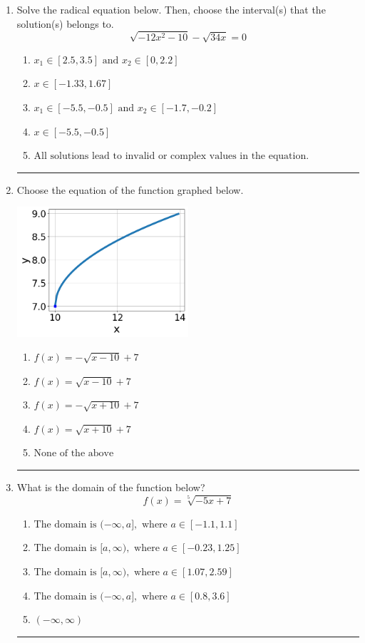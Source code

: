 \documentclass[14pt]{extbook}
\newcommand{\litem}[1]{\item#1\hspace*{-1cm}\rule{\textwidth}{0.4pt}}
\begin{document}
\begin{enumerate}
{\begin{enumerate}[label=\Alph*.]
\end{enumerate} }
\litem{
Solve the radical equation below. Then, choose the interval(s) that the solution(s) belongs to.\[ \sqrt{-12 x^2 - 10} - \sqrt{34 x} = 0 \]\begin{enumerate}[label=\Alph*.]
\item \( x_1 \in [2.5, 3.5] \text{ and } x_2 \in [0,2.2] \)
\item \( x \in [-1.33,1.67] \)
\item \( x_1 \in [-5.5, -0.5] \text{ and } x_2 \in [-1.7,-0.2] \)
\item \( x \in [-5.5,-0.5] \)
\item \( \text{All solutions lead to invalid or complex values in the equation.} \)

\end{enumerate} }
\litem{
Choose the equation of the function graphed below.
\begin{center}
    \includegraphics[width=0.5\textwidth]{../Figures/radicalGraphToEquationCopyA.png}
\end{center}
\begin{enumerate}[label=\Alph*.]
\item \( f(x) = - \sqrt{x - 10} + 7 \)
\item \( f(x) = \sqrt{x - 10} + 7 \)
\item \( f(x) = - \sqrt{x + 10} + 7 \)
\item \( f(x) = \sqrt{x + 10} + 7 \)
\item \( \text{None of the above} \)

\end{enumerate} }
\litem{
What is the domain of the function below?\[ f(x) = \sqrt[5]{-5 x + 7} \]\begin{enumerate}[label=\Alph*.]
\item \( \text{The domain is } (-\infty, a], \text{   where } a \in [-1.1, 1.1] \)
\item \( \text{The domain is } [a, \infty), \text{   where } a \in [-0.23, 1.25] \)
\item \( \text{The domain is } [a, \infty), \text{   where } a \in [1.07, 2.59] \)
\item \( \text{The domain is } (-\infty, a], \text{   where } a \in [0.8, 3.6] \)
\item \( (-\infty, \infty) \)


\end{enumerate}}
\end{enumerate}
\end{document}
